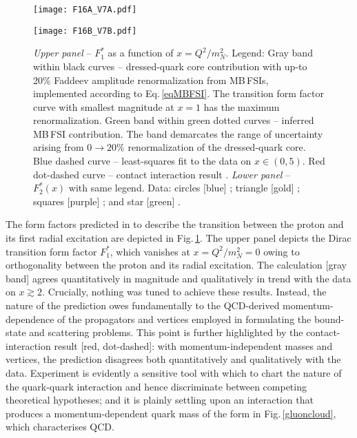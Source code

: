 \begin{figure}[!t]
%
\texttt{[image: F16A\_V7A.pdf]}\hspace*{0.9em}
\vspace*{1ex}

\centerline{%
\texttt{[image: F16B\_V7B.pdf]}}
%
%
\caption{\label{figFT}
%
\emph{Upper panel} -- $F_{1}^{\ast}$ as a function of $x=Q^2/m_N^2$.
%
Legend: Gray band within black curves -- dressed-quark core contribution with up-to 20\% Faddeev amplitude renormalization from MB\,FSIs, implemented according to Eq.\,\eqref{eqMBFSI}.  The transition form factor curve with smallest magnitude at $x=1$ has the maximum renormalization.
%
Green band within green dotted curves -- inferred MB\,FSI contribution.  The band demarcates the range of uncertainty arising from $0\to 20$\% renormalization of the dressed-quark core.
%
Blue dashed curve --  least-squares fit to the data on $x \in (0,5)$.
%
Red dot-dashed curve -- contact interaction result \cite{Wilson:2011aa}.
%
\emph{Lower panel} -- $F_{2}^{\ast}(x)$ with same legend.
%
Data: circles [blue] \cite{Aznauryan:2009mx};
triangle [gold] \cite{Dugger:2009pn};
squares [purple] \cite{Mokeev:2012vsa, Mokeev:2015lda};
and star [green] \cite{Olive:2016xmw}.}
\end{figure}

The form factors predicted in \cite{Segovia:2015hra} to describe the transition between the proton and its first radial excitation are depicted in Fig.\,\ref{figFT}.
%
The upper panel depicts the Dirac transition form factor $F_{1}^{\ast}$, which vanishes at $x=Q^2/m_N^2 =0$ owing to orthogonality between the proton and its radial excitation.  The calculation [gray band] agrees quantitatively in magnitude and qualitatively in trend with the data on $x\gtrsim 2$.  Crucially, nothing was tuned to achieve these results.  Instead, the nature of the prediction owes fundamentally to the QCD-derived momentum-dependence of the propagators and vertices employed in formulating the bound-state and scattering problems.  This point is further highlighted by the contact-interaction result [red, dot-dashed]: with momentum-independent masses and vertices, the prediction disagrees both quantitatively and qualitatively with the data.  Experiment is evidently a sensitive tool with which to chart the nature of the quark-quark interaction and hence discriminate between competing theoretical hypotheses; and it is plainly settling upon an interaction that produces a momentum-dependent quark mass of the form in Fig.\,\ref{gluoncloud}, which characterises QCD.

